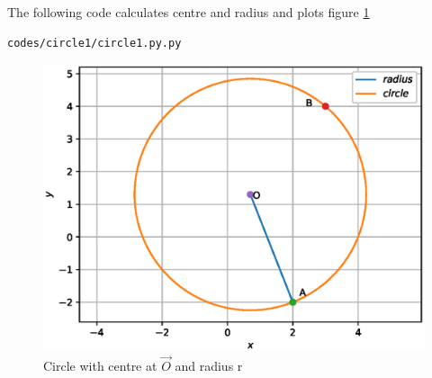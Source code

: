 \begin{enumerate}[label=\thesection.\arabic*.,ref=\thesection.\theenumi]
The following code calculates centre and radius and plots figure \ref{fig:circle1}
\begin{lstlisting}
codes/circle1/circle1.py.py
\end{lstlisting}
\begin{figure}[!ht]
\centering
\includegraphics[width=\columnwidth]{./codes/circle1/pyfigs/circle1.eps}
\caption{Circle with centre at $\vec{O}$ and radius r}
\label{fig:circle1}
\end{figure}

\end{enumerate}
